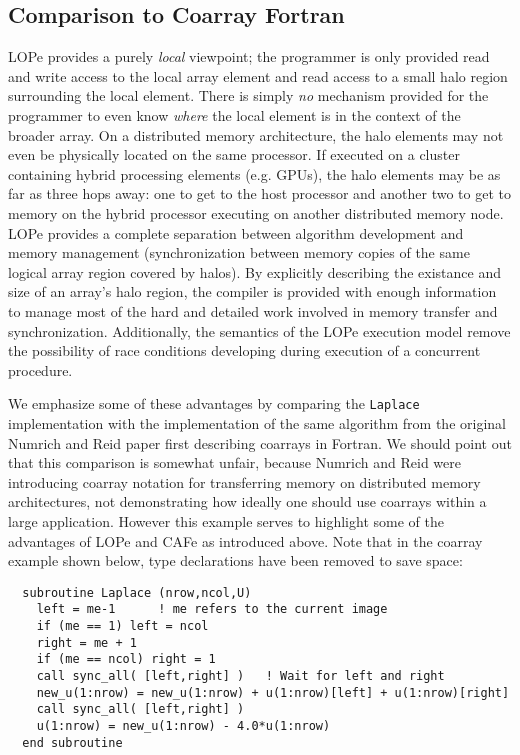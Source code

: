 \subsection{Comparison to Coarray Fortran}

LOPe provides a purely \emph{local} viewpoint; the programmer is only provided read and write access
to the local array element and read access to a small halo region surrounding the local element.
There is simply \emph{no} mechanism provided for the programmer to even know \emph{where} the local
element is in the context of the broader array.  On a distributed memory architecture, the halo
elements may not even be physically located on the same processor.  If executed on a cluster
containing hybrid processing elements (e.g. GPUs), the halo elements may be as far as three hops
away: one to get to the host processor and another two to get to memory on the hybrid processor
executing on another distributed memory node.  LOPe provides a complete separation between algorithm
development and memory management (synchronization between memory copies of the same logical
array region covered by halos).  By explicitly describing the existance and size of an array's halo
region, the compiler is provided with enough information to manage most of the hard and detailed
work involved in memory transfer and synchronization.  Additionally, the semantics of the LOPe
execution model remove the possibility of race conditions developing during execution of a
concurrent procedure.

We emphasize some of these advantages by comparing the \texttt{Laplace} implementation with the
implementation of the same algorithm from the original Numrich and Reid paper first describing
coarrays in Fortran.  We should point out that this comparison is somewhat unfair, because Numrich
and Reid were introducing coarray notation for transferring memory on distributed memory
architectures, not demonstrating how ideally one should use coarrays within a large application.
However this example serves
to highlight some of the advantages of LOPe and CAFe as introduced above.  Note that in the coarray
example shown below, type declarations have been removed to save space:
{\small \begin{verbatim}
  subroutine Laplace (nrow,ncol,U)
    left = me-1      ! me refers to the current image
    if (me == 1) left = ncol
    right = me + 1
    if (me == ncol) right = 1
    call sync_all( [left,right] )   ! Wait for left and right
    new_u(1:nrow) = new_u(1:nrow) + u(1:nrow)[left] + u(1:nrow)[right]
    call sync_all( [left,right] )
    u(1:nrow) = new_u(1:nrow) - 4.0*u(1:nrow)
  end subroutine
\end{verbatim}}

